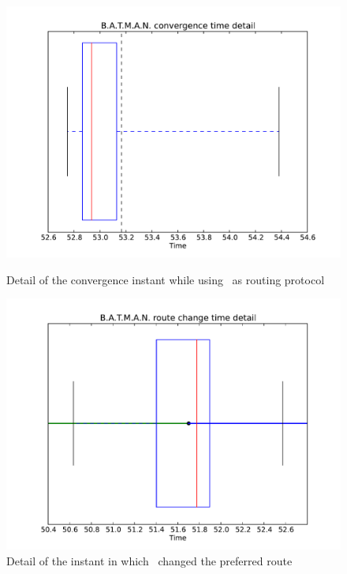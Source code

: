 \begin{figure}[bhtp]
  \begin{minipage}[b]{0.5\linewidth}
    \centering
    \includegraphics[width=\linewidth]{images/convergence_batman_plot_convergence_time}
    \caption{Detail of the convergence instant while using \batman\ as
             routing protocol}
    \label{pic:batman_convergence_time}
  \end{minipage}
  \hspace{0.5cm}
  \begin{minipage}[b]{0.5\linewidth}
    \centering
    \includegraphics[width=\linewidth]{images/convergence_batman_plot_nexthop_change}
    \caption{Detail of the instant in which \batman\ changed the
                 preferred route}
    \label{pic:batman_convergence_change}
  \end{minipage}
\end{figure}


